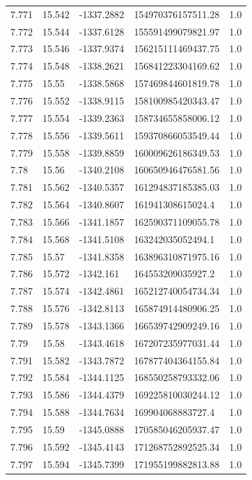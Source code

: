 \begin{tabular}{lllll}
7.771 & 15.542 & -1337.2882 & 154970376157511.28 & 1.0 \\
7.772 & 15.544 & -1337.6128 & 155591499079821.97 & 1.0 \\
7.773 & 15.546 & -1337.9374 & 156215111469437.75 & 1.0 \\
7.774 & 15.548 & -1338.2621 & 156841223304169.62 & 1.0 \\
7.775 & 15.55 & -1338.5868 & 157469844601819.78 & 1.0 \\
7.776 & 15.552 & -1338.9115 & 158100985420343.47 & 1.0 \\
7.777 & 15.554 & -1339.2363 & 158734655858006.12 & 1.0 \\
7.778 & 15.556 & -1339.5611 & 159370866053549.44 & 1.0 \\
7.779 & 15.558 & -1339.8859 & 160009626186349.53 & 1.0 \\
7.78 & 15.56 & -1340.2108 & 160650946476581.56 & 1.0 \\
7.781 & 15.562 & -1340.5357 & 161294837185385.03 & 1.0 \\
7.782 & 15.564 & -1340.8607 & 161941308615024.4 & 1.0 \\
7.783 & 15.566 & -1341.1857 & 162590371109055.78 & 1.0 \\
7.784 & 15.568 & -1341.5108 & 163242035052494.1 & 1.0 \\
7.785 & 15.57 & -1341.8358 & 163896310871975.16 & 1.0 \\
7.786 & 15.572 & -1342.161 & 164553209035927.2 & 1.0 \\
7.787 & 15.574 & -1342.4861 & 165212740054734.34 & 1.0 \\
7.788 & 15.576 & -1342.8113 & 165874914480906.25 & 1.0 \\
7.789 & 15.578 & -1343.1366 & 166539742909249.16 & 1.0 \\
7.79 & 15.58 & -1343.4618 & 167207235977031.44 & 1.0 \\
7.791 & 15.582 & -1343.7872 & 167877404364155.84 & 1.0 \\
7.792 & 15.584 & -1344.1125 & 168550258793332.06 & 1.0 \\
7.793 & 15.586 & -1344.4379 & 169225810030244.12 & 1.0 \\
7.794 & 15.588 & -1344.7634 & 169904068883727.4 & 1.0 \\
7.795 & 15.59 & -1345.0888 & 170585046205937.47 & 1.0 \\
7.796 & 15.592 & -1345.4143 & 171268752892525.34 & 1.0 \\
7.797 & 15.594 & -1345.7399 & 171955199882813.88 & 1.0 \\

\end{tabular}
